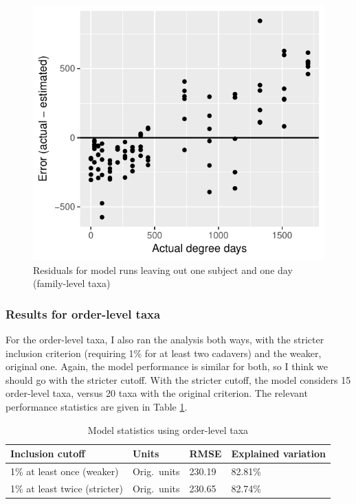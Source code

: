 \documentclass{article}
\begin{document}
\begin{figure}
  \centering
  \includegraphics{../../only_families/all_time_steps/hit_1perc_twice/leave_out_one_subj_and_one_day_residuals}
  \caption{Residuals for model runs leaving out one subject and one day (family-level taxa)}
  \label{fig:leave_one_out_resids_family_taxa}
\end{figure}




\subsubsection{Results for order-level taxa}

For the order-level taxa, I also ran the analysis both ways, with the
stricter inclusion criterion (requiring 1\% for at least two cadavers)
and the weaker, original one.  Again, the model performance is similar
for both, so I think we should go with the stricter cutoff.  With the
stricter cutoff, the model considers 15 order-level taxa, versus 20
taxa with the original criterion.  The relevant performance statistics
are given in Table \ref{tbl:order_all_data_model_stats}.

\begin{table}
  \centering
  \caption{\label{tbl:order_all_data_model_stats}Model statistics using order-level taxa}
\begin{tabular}{llll}
Inclusion cutoff & Units  & RMSE & Explained variation\\ \hline
1\% at least once (weaker)  & Orig.~units & 230.19 & 82.81\%\\
1\% at least twice (stricter) & Orig.~units & 230.65 & 82.74\%
\end{tabular}
\end{table}
\end{document}
